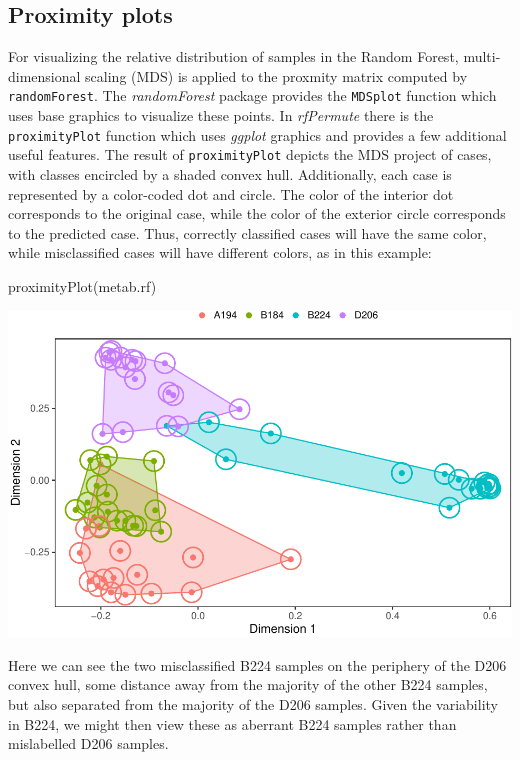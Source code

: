 \subsection{Proximity plots}\label{proximity-plots}

For visualizing the relative distribution of samples in the Random
Forest, multi-dimensional scaling (MDS) is applied to the proxmity
matrix computed by \texttt{randomForest}. The \emph{randomForest}
package provides the \texttt{MDSplot} function which uses base graphics
to visualize these points. In \emph{rfPermute} there is the
\texttt{proximityPlot} function which uses \emph{ggplot} graphics and
provides a few additional useful features. The result of
\texttt{proximityPlot} depicts the MDS project of cases, with classes
encircled by a shaded convex hull. Additionally, each case is
represented by a color-coded dot and circle. The color of the interior
dot corresponds to the original case, while the color of the exterior
circle corresponds to the predicted case. Thus, correctly classified
cases will have the same color, while misclassified cases will have
different colors, as in this example:

\begin{Schunk}
\begin{Sinput}
proximityPlot(metab.rf)
\end{Sinput}

\includegraphics{archer_files/figure-latex/proximityPlot-1} \end{Schunk}

Here we can see the two misclassified B224 samples on the periphery of
the D206 convex hull, some distance away from the majority of the other
B224 samples, but also separated from the majority of the D206 samples.
Given the variability in B224, we might then view these as aberrant B224
samples rather than mislabelled D206 samples.

